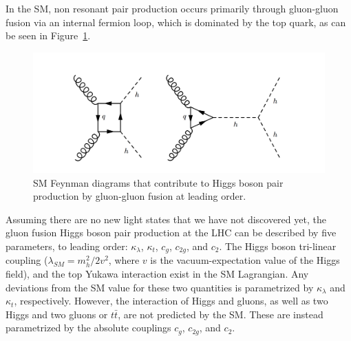 In the SM, non resonant pair production occurs primarily through gluon-gluon fusion via an internal fermion loop, which is dominated by the top quark, as can be seen in Figure~\ref{fig:SMdia}. 
\begin{figure}[h]
\centering
\includegraphics[scale=0.85]{F2/dihiggs.png}
\caption{SM Feynman diagrams that contribute to Higgs boson pair production by gluon-gluon fusion at leading order.  \label{fig:SMdia}}
\end{figure}
Assuming there are no new light states that we have not discovered yet, the gluon fusion Higgs boson pair production at the LHC can be described by five parameters, to leading order: $\kappa_{\lambda}$, $\kappa_{t}$, $c_g$, $c_{2g}$, and $c_2$. The Higgs boson tri-linear coupling ($\lambda_{SM}=m_h^2/2v^2$, where $v$ is the vacuum-expectation value of the Higgs field), and the top Yukawa interaction exist in the SM Lagrangian. Any deviations from the SM value for these two quantities is parametrized by $\kappa_{\lambda}$ and $\kappa_{t}$, respectively. However, the interaction of Higgs and gluons, as well as two Higgs and two gluons or $t\bar{t}$, are not predicted by the SM. These are instead parametrized by the absolute couplings $c_g$, $c_{2g}$, and $c_2$. 

